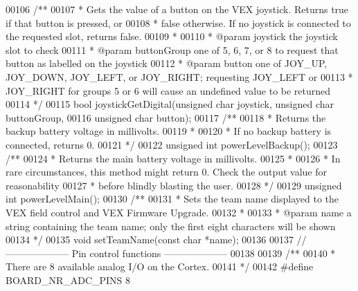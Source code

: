 \begin{DoxyCode}
00106 \textcolor{comment}{/**}
00107 \textcolor{comment}{ * Gets the value of a button on the VEX joystick. Returns true if that button is pressed, or}
00108 \textcolor{comment}{ * false otherwise. If no joystick is connected to the requested slot, returns false.}
00109 \textcolor{comment}{ *}
00110 \textcolor{comment}{ * @param joystick the joystick slot to check}
00111 \textcolor{comment}{ * @param buttonGroup one of 5, 6, 7, or 8 to request that button as labelled on the joystick}
00112 \textcolor{comment}{ * @param button one of JOY\_UP, JOY\_DOWN, JOY\_LEFT, or JOY\_RIGHT; requesting JOY\_LEFT or}
00113 \textcolor{comment}{ * JOY\_RIGHT for groups 5 or 6 will cause an undefined value to be returned}
00114 \textcolor{comment}{ */}
00115 \textcolor{keywordtype}{bool} joystickGetDigital(\textcolor{keywordtype}{unsigned} \textcolor{keywordtype}{char} joystick, \textcolor{keywordtype}{unsigned} \textcolor{keywordtype}{char} buttonGroup,
00116        \textcolor{keywordtype}{unsigned} \textcolor{keywordtype}{char} button);
00117 \textcolor{comment}{/**}
00118 \textcolor{comment}{ * Returns the backup battery voltage in millivolts.}
00119 \textcolor{comment}{ *}
00120 \textcolor{comment}{ * If no backup battery is connected, returns 0.}
00121 \textcolor{comment}{ */}
00122 \textcolor{keywordtype}{unsigned} \textcolor{keywordtype}{int} powerLevelBackup();
00123 \textcolor{comment}{/**}
00124 \textcolor{comment}{ * Returns the main battery voltage in millivolts.}
00125 \textcolor{comment}{ *}
00126 \textcolor{comment}{ * In rare circumstances, this method might return 0. Check the output value for reasonability}
00127 \textcolor{comment}{ * before blindly blasting the user.}
00128 \textcolor{comment}{ */}
00129 \textcolor{keywordtype}{unsigned} \textcolor{keywordtype}{int} powerLevelMain();
00130 \textcolor{comment}{/**}
00131 \textcolor{comment}{ * Sets the team name displayed to the VEX field control and VEX Firmware Upgrade.}
00132 \textcolor{comment}{ *}
00133 \textcolor{comment}{ * @param name a string containing the team name; only the first eight characters will be shown}
00134 \textcolor{comment}{ */}
00135 \textcolor{keywordtype}{void} setTeamName(\textcolor{keyword}{const} \textcolor{keywordtype}{char} *name);
00136 
00137 \textcolor{comment}{// -------------------- Pin control functions --------------------}
00138 
00139 \textcolor{comment}{/**}
00140 \textcolor{comment}{ * There are 8 available analog I/O on the Cortex.}
00141 \textcolor{comment}{ */}
00142 \textcolor{preprocessor}{#}\textcolor{preprocessor}{define} \textcolor{preprocessor}{BOARD\_NR\_ADC\_PINS} 8

\end{DoxyCode}
